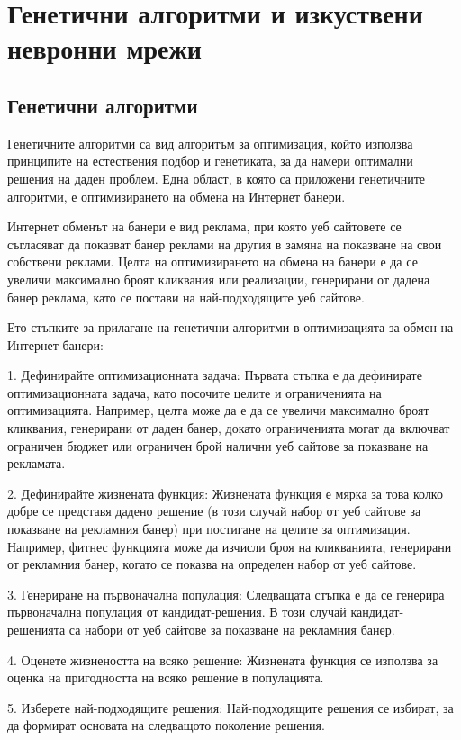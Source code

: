 \section{Генетични алгоритми и изкуствени невронни мрежи}

\subsection{Генетични алгоритми}

Генетичните алгоритми са вид алгоритъм за оптимизация, който използва принципите на естествения подбор и генетиката, за да намери оптимални решения на даден проблем. Една област, в която са приложени генетичните алгоритми, е оптимизирането на обмена на Интернет банери.

Интернет обменът на банери е вид реклама, при която уеб сайтовете се съгласяват да показват банер реклами на другия в замяна на показване на свои собствени реклами. Целта на оптимизирането на обмена на банери е да се увеличи максимално броят кликвания или реализации, генерирани от дадена банер реклама, като се постави на най-подходящите уеб сайтове.

Ето стъпките за прилагане на генетични алгоритми в оптимизацията за обмен на Интернет банери:

1. Дефинирайте оптимизационната задача: Първата стъпка е да дефинирате оптимизационната задача, като посочите целите и ограниченията на оптимизацията. Например, целта може да е да се увеличи максимално броят кликвания, генерирани от даден банер, докато ограниченията могат да включват ограничен бюджет или ограничен брой налични уеб сайтове за показване на рекламата.

2. Дефинирайте жизнената функция: Жизнената функция е мярка за това колко добре се представя дадено решение (в този случай набор от уеб сайтове за показване на рекламния банер) при постигане на целите за оптимизация. Например, фитнес функцията може да изчисли броя на кликванията, генерирани от рекламния банер, когато се показва на определен набор от уеб сайтове.

3. Генериране на първоначална популация: Следващата стъпка е да се генерира първоначална популация от кандидат-решения. В този случай кандидат-решенията са набори от уеб сайтове за показване на рекламния банер.

4. Оценете жизнеността на всяко решение: Жизнената функция се използва за оценка на пригодността на всяко решение в популацията.

5. Изберете най-подходящите решения: Най-подходящите решения се избират, за да формират основата на следващото поколение решения.

